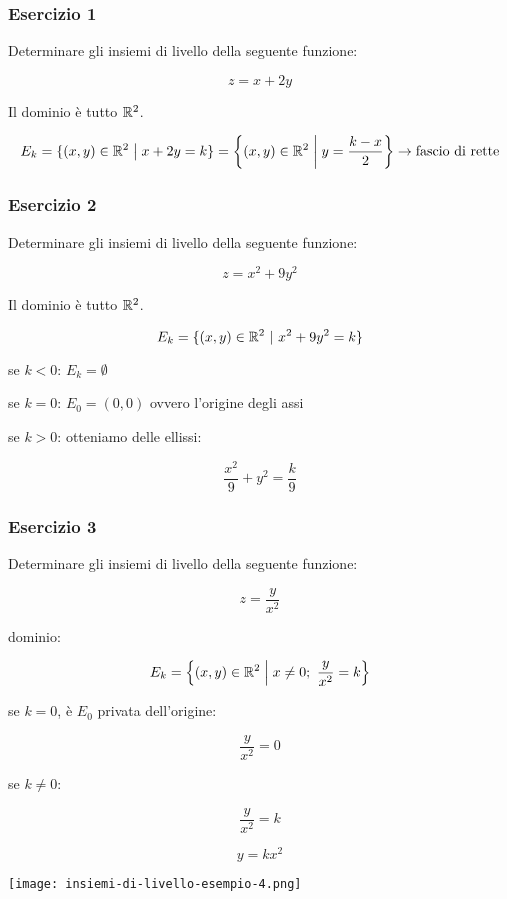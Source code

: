 \subsubsection*{Esercizio 1}

Determinare gli insiemi di livello della seguente funzione:

\[
    z = x+2y
\]

Il dominio è tutto \(\R^2\).

\[
    E_k = \{(x,y) \in \R^2 \giventhat x+2y = k\} = \left\{(x,y) \in \R^2 \giventhat[\bigg] y = \frac{k-x}{2}\right\} \to \text{fascio di rette}
\]

\filbreak{}
\subsubsection*{Esercizio 2}

Determinare gli insiemi di livello della seguente funzione:

\[
    z = x^{2}+9y^{2}
\]

Il dominio è tutto \(\R^2\).

\[
    E_k = \{(x,y) \in \R^{2}\ \vert\ x^{2}+9y^{2}=k\}
\]

se \(k<0\): \(E_k = \emptyset \)

se \(k=0\): \(E_0=(0,0)\) ovvero l'origine degli assi

se \(k>0\): otteniamo delle ellissi:

\[
    \frac{x^{2}}{9}+ y^{2} = \frac{k}{9}
\]

\filbreak{}
\subsubsection*{Esercizio 3}

Determinare gli insiemi di livello della seguente funzione:

\[
    z= \frac{y}{x^{2}}
\]

dominio:

\[
    E_k = \left\{(x,y) \in \R^{2} \giventhat[\Big] x \neq  0;\ \frac{y}{x^{2}}=k \right\}
\]

se \(k=0\), è \(E_0\) privata dell'origine:

\[
    \frac{y}{x^{2}}=0
\]

se \(k \ne 0\):

\[
    \frac{y}{x^{2}} = k
\]

\[
    y = kx^{2}
\]

\vspace{5mm}
\begin{center}
    \texttt{[image: insiemi-di-livello-esempio-4.png]}
\end{center}

